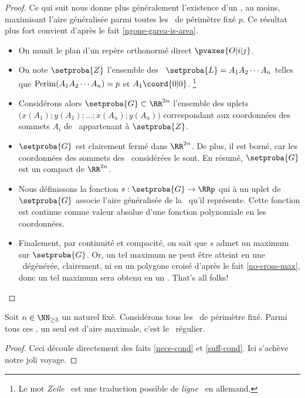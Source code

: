 \begin{proof}
	Ce qui suit nous donne plus généralement l'existence d'un \ngone, au moins, maximisant l'aire généralisée parmi toutes les \nlines\ de périmètre fixé $p$. Ce résultat plus fort convient d'après le fait \ref{ngone-garea-is-area}.
    \begin{itemize}
        \item On munit le plan d'un repère orthonormé direct $\pvaxes{O | i | j}$. 


        \item On note $\setproba{Z}$ l'ensemble des \nlines\ $\setproba{L} = A_1 A_2 \cdots A_n$ telles que
        $\mathrm{Perim}(A_1 A_2 \cdots A_n) = p$
        et
        $A_1\coord{0 | 0}$.%
        \footnote{
        	Le mot \og \emph{Zeile} \fg\ est une traduction possible de \og \emph{ligne} \fg\ en allemand.
        }


        \item Considérons alors $\setproba{G} \subset \RR^{2n}$ l'ensemble des uplets $\big( x(A_1) ; y(A_1) ; \dots ; x(A_n) ; y(A_n) \big)$ correspondant aux coordonnées des sommets $A_i$ de \nlines\ appartenant à $\setproba{Z}$.
        
        
        \item $\setproba{G}$ est clairement fermé dans $\RR^{2n}$.
        De plus, il est borné, car les coordonnées des sommets des \nlines\ considérées le sont.        
        En résumé, $\setproba{G}$ est un compact de $\RR^{2n}$.


        \item Nous définissons la fonction $s: \setproba{G} \rightarrow \RRp$ qui à un uplet de $\setproba{G}$ associe l'aire généralisée de la \nline\ qu'il représente. 
        Cette fonction est continue comme valeur absolue d'une fonction polynomiale en les coordonnées.
       
        
        \item Finalement, par continuité et compacité, on sait que $s$ admet un maximum sur $\setproba{G}$.
        Or, un tel maximum ne peut être atteint en une \nline\ dégénérée, clairement, ni en un polygone croisé d'après le fait \ref{no-cross-max}, donc un tel maximum sera obtenu en un \ngone. That's all folks!
    \end{itemize}    
\end{proof}




\begin{fact}
    Soit $n \in \NN_{\geq3}$ un naturel fixé.
    Considérons tous les \ngones\  de périmètre fixé. Parmi tous ces \ngones, un seul est d'aire maximale, c'est le \ngone\ régulier.
\end{fact}


\begin{proof}
    Ceci découle directement des faits \ref{nece-cond} et \ref{suff-cond}.
    Ici s'achève notre joli voyage.
\end{proof}